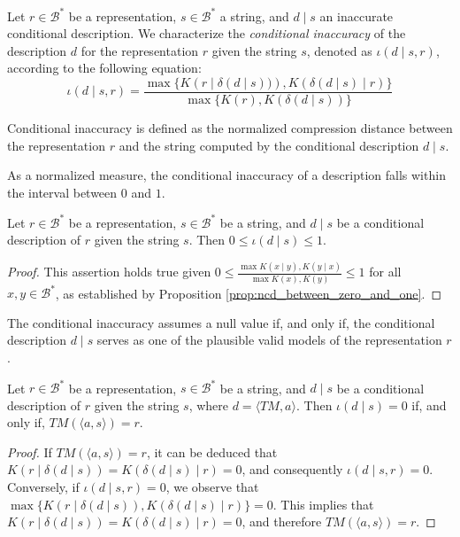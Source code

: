 \begin{definition}
Let $r \in \mathcal{B}^\ast$ be a representation, $s \in \mathcal{B}^\ast$ a string, and $d \mid s$ an inaccurate conditional description. We characterize the \emph{conditional inaccuracy} of the description $d$ for the representation $r$ given the string $s$, denoted as $\iota(d \mid s, r)$, according to the following equation:
\[
\iota(d \mid s, r) = \frac{ \max\{ K \left(r \mid \delta(d \mid s) ) \right), K \left( \delta(d \mid s) \mid r \right) \} } { \max\{ K(r), K \left( \delta(d \mid s) \right) \} }
\]
\end{definition}

Conditional inaccuracy is defined as the normalized compression distance between the representation $r$ and the string computed by the conditional description $d \mid s$.

As a normalized measure, the conditional inaccuracy of a description falls within the interval between $0$ and $1$.

\begin{proposition}
\label{prop:range_conditional_inaccuracy}
Let $r \in \mathcal{B}^\ast$ be a representation, $s \in \mathcal{B}^\ast$ be a string, and $d \mid s$ be a conditional description of $r$ given the string $s$. Then $0 \leq \iota(d \mid s) \leq 1$.
\end{proposition}
\begin{proof}
This assertion holds true given $0 \leq \frac{ \max{ K(x \mid y), K(y \mid x) } } { \max{ K(x), K(y) } } \leq 1$ for all $x, y \in \mathcal{B}^\ast$, as established by Proposition \ref{prop:ncd_between_zero_and_one}.
\end{proof}

The conditional inaccuracy assumes a null value if, and only if, the conditional description $d \mid s$ serves as one of the plausible valid models of the representation $r$.

\begin{proposition}\label{prop:perfect_description}
Let $r \in \mathcal{B}^\ast$ be a representation, $s \in \mathcal{B}^\ast$ be a string, and $d \mid s$ be a conditional description of $r$ given the string $s$, where $d = \langle TM, a \rangle$. Then $\iota(d \mid s) = 0$ if, and only if, $TM \left(\langle a, s \rangle \right) = r$.
\end{proposition}
\begin{proof}
If $TM \left(\langle a, s \rangle \right) = r$, it can be deduced that $K \left( r \mid \delta(d \mid s) \right) = K \left( \delta(d \mid s) \mid r \right) = 0$, and consequently $\iota(d \mid s, r) = 0$. Conversely, if $\iota(d \mid s, r) = 0$, we observe that $\max\{ K \left( r \mid \delta(d \mid s) \right), K \left( \delta(d \mid s) \mid r \right) \} = 0$. This implies that $K \left( r \mid \delta(d \mid s) \right) = K \left( \delta(d \mid s) \mid r \right) = 0$, and therefore $TM \left(\langle a, s \rangle \right) = r$.
\end{proof}

